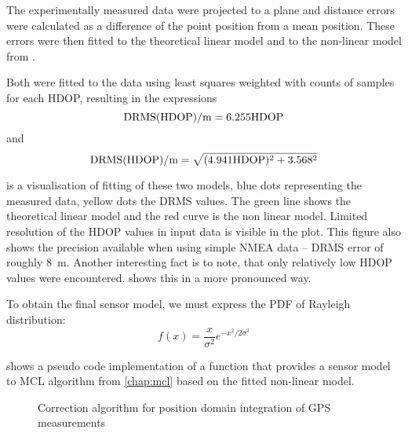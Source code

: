 The experimentally measured data were projected to a plane and distance errors
were calculated as a difference of the point position from a mean position.
These errors were then fitted to the theoretical linear model and to
the non-linear model from \cite{www-wilson}.

Both were fitted to the data using least squares weighted with counts of samples
for each HDOP, resulting in the expressions
\begin{equation}
\mathrm{DRMS}(\mathrm{HDOP}) / \si{\meter} = \num{6.255} \mathrm{HDOP}
\end{equation}
and
\begin{equation}
\mathrm{DRMS}(\mathrm{HDOP}) / \si{\meter} = \sqrt{(\num{4.941}\mathrm{HDOP})^2 + \num{3.568}^2}
\end{equation}

 is a visualisation of fitting of these two models,
blue dots representing the measured data, yellow dots the DRMS values.
The green line shows the theoretical linear model and the red curve is the non linear model.
Limited resolution of the HDOP values in input data is visible in the plot.
This figure also shows the precision available when using simple NMEA data --
DRMS error of roughly \SI{8}{\meter}.
Another interesting fact is to note, that only relatively low HDOP values were encountered.
 shows this in a more pronounced way.

To obtain the final sensor model, we must express the PDF of Rayleigh distribution:
\begin{equation}
    f(x) = \frac{x}{\sigma^2}e^{-x^2/2\sigma^2}
\end{equation}

 shows a pseudo code implementation of a function
that provides a sensor model to MCL algorithm from \cref{chap:mcl} based on the
fitted non-linear model.

\begin{figure}[tp]
\begin{algorithm}[H]


\end{algorithm}
\caption{Correction algorithm for position domain integration of GPS measurements}
\label{algo:gps-position-domain}
\end{figure}

